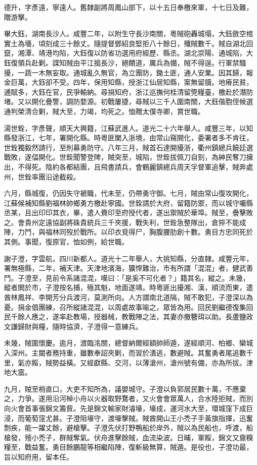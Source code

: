 \begin{pinyinscope}
德升，字彥遠，寧遠人。舊隸副將周鳳山部下，以十五日奉檄來軍，十七日及難，贈游擊。

畢大鈺，湖南長沙人。咸豐二年，以附生守長沙南關，粵賊砲轟城塌，大鈺斂空棺實土為墻，頃刻成三十餘丈。隨提督鄧紹良堅拒八十餘日，殲賊數千。賊自湖北回竄，湘潭、靖港均陷，大鈺復以防省功選用府經歷、縣丞。湖北崇陽、通城陷，大鈺復領兵赴剿。諜知賊由平江搗長沙，絕饋道，厲兵為備，賊不得逞。行軍禁騷擾，一蔬一木無妄取。通城亂久無官，為立團防，鋤土匪，通人安業。因其歸，報金巨萬，大鈺卻不受。四年，保用知縣，授浙江仙居知縣，案無留牘。地瘠民貧，逋賦多，大鈺在官，民爭輸納。尋捐知府，浙江巡撫何桂清留筦糧臺，檄赴於潛防堵。又以開化疊警，調防婺源。初戰屢捷，尋賊以三千人圍南關，大鈺偕胞侄候選通判榮清合剿，賊大至，力竭，均死之。恤贈太僕寺卿，賞世職。

湯世銓，字彥聲，順天大興籍，江蘇武進人。道光二十六年舉人。咸豐三年，以知縣發浙江，七年，署開化縣。時粵匪闌入浙境，由常山窺開化，委署者多不肯往，世銓獨毅然請行，至則募勇防守。八年三月，賊首石達開擾浙，衢州鎮總兵饒廷選戰敗，遂偪開化。世銓聞警登陴，賊突至，城陷，世銓拔佩刀自剄，為紳民奪刀擁出，不得死。陰約各都結團，且飛書請兵，會鶴麗鎮總兵周天孚督軍追擊，賊奔處州，世銓率團沿途截殺。

六月，縣城復，仍因失守褫職，代未至，仍帶勇守御。七月，賊由常山復攻開化，江蘇候補知縣劉福林帥鄉勇方檄赴寧國。世銓請於大府，留籍防禦，而以城守囑縣丞某，且出印印其衣，畢，遣人賚印至府授代者，遂出禦賊於華埠。賊至，疊擊敗之。會貴州定遠協副將硃貴統兵三千夾援，戰失利，世銓急整隊出，倉猝不能成陣，力鬥，與福林同歿於戰所。以印衣覓得尸，胸腹腰肋創十數。勇目方忠同死於其側。事聞，復原官，恤如例，給世職。

謝子澄，字雲航，四川新都人。道光十二年舉人，大挑知縣，分直隸。咸豐元年，署無極縣，二年，補天津。天津地濱海，獷悍難治，市有所謂「混混」者，健武善鬥。子澄至，見前令系諸混混，嘆曰：「是奚不可化者？」籍其名，縱之。未幾，縱者閧於市，子澄按名捕，殛其魁，地面遂靖。時粵匪出擾湘、漢，順流而東，遣酋林鳳祥、李開芳分兵渡河，莫測所向。人方謂南北道隔，賊不敢犯，子澄深以為憂。捐金倡團練，召所縱諸混混，以周處故事喻之，眾皆為用。回民劉繼德復集回民千餘人應之，遂率赴教場，授器械，教戰陣之法，其妻亦撤簪珥以助。長蘆鹽政文謙歸財與糧，隨時協濟，子澄得一意練兵。

未幾，賊圍懷慶。逾月，渡臨洺關，總督納爾經額帥師遁，遂經順河、柏鄉、欒城入深州。主閫者務持重，雖數奉詔夾剿，而習於潰逃，數避賊。其奮勇者尾追數千里，氣亦餒，賊勢益橫。又經獻縣、交河，以薄滄州，滄州號有備，亦為所拔。津地大震。

九月，賊至梢直口，大吏不知所為，議嬰城守。子澄以負郭居民數十萬，不應棄之，力爭。遂用沿河棹小舟以火器取野鶩者，又火會會眾萬人，合水陸拒賊，而別向火會首事張錦文籌貲。先是錦文輸家財濬壕，壕成，運河水大至，環城窪下成巨浸，而葡萄窪尤甚。子澄阻壕守，渡壕擊賊。賊酋開山王小禿子手黃旗指揮，迅奮剽疾，能一躍丈餘，避槍擊。子澄先伏打野鴨船於岸外，賊以為民船也，呼渡，船槍發，殪小禿子，群賊奪氣。伏舟進擊餘賊，血流染波。日晡，軍餒，錦文又齎糗糧至，戰益奮。勇目餘鵬龍等相繼陷陣，復斬級無算，賊遁。是役也，子澄功最，旨以知府用，留本任。


\end{pinyinscope}
